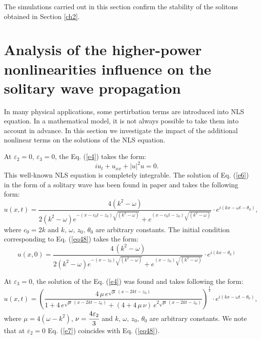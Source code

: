 \documentclass[preprint,12pt]{elsarticle}
\begin{document}
The simulations carried out in this section confirm the stability of the solitons obtained in Section \ref{ch2}.
\section{Analysis of the higher-power nonlinearities influence on the solitary wave propagation}\label{ch9}
In many physical applications, some pertirbation terms are introduced into NLS equation. In a mathematical model, it is not always possible to take them into account in advance. In this section we investigate the impact of the additional nonlinear terms on the solutions of the NLS equation.

At \(\varepsilon_{2}=0,\,\varepsilon_{3}=0\), the Eq. (\ref{e4}) takes the form:
\begin{equation}\label{e6}
iu_{t}+u_{xx}+|u|^2 u=0.
\end{equation}
This well-known NLS equation is completely integrable. The solution of Eq. (\ref{e6}) in the form of a solitary wave has been found in paper \cite{Rad3} and takes the following form:
\begin{equation} \label{eq48}
u(x,t)=\frac{4(k^{2}-\omega)}{2 (k^{2}-\omega) e^{-\left(x-c_{0}t-z_{0}\right)\sqrt{(k^{2}-\omega)}}+e^{\left(x-c_{0}t-z_{0}\right)\sqrt{(k^{2}-\omega)}}}\cdot e^{i(kx-\omega t-\theta_{0})},
\end{equation}
where \(c_{0}=2k\) and \( k,\, \omega,\, z_{0},\, \theta_{0}\) are arbitrary constants.
The initial condition corresponding to Eq. (\ref{eq48}) takes the form:
\begin{equation}\label{eq55}
u(x,0)=\frac{4\,(k^{2}-\omega)}{2 (k^{2}-\omega) e^{-(x-z_{0})\sqrt{(k^{2}-\omega)}}+e^{(x-z_{0})\sqrt{(k^{2}-\omega)}}}\cdot e^{i(kx-\theta_{0})}
\end{equation}

At \(\varepsilon_{3}=0\), the solution of the Eq. (\ref{e4}) was found and takes following the form:
\begin{equation}\label{e7}
u(x,t)=\left(\frac{4\,\mu\, e^{\sqrt{\mu}\,(x-2kt-z_{0})}}{1+4\, e^{\sqrt{\mu}\,(x-2kt-z_{0})}+(4+4\, \mu\, \nu) \,e^{2\sqrt{\mu}\,(x-2kt-z_{0})}}\right)^{\frac{1}{2}}\cdot e^{i(kx-\omega t-\theta_{0})},
\end{equation}
where \(\mu=4(\omega-k^{2})\), \(\nu=\cfrac{4 \varepsilon_{2}}{3}\) and \( k,\, \omega,\, z_{0},\, \theta_{0}\) are arbitrary constants. We note that at \(\varepsilon_{2}=0\) Eq. (\ref{e7}) coincides with Eq. (\ref{eq48}).
\end{document}
